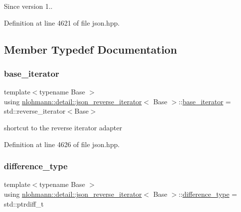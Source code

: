 \begin{DoxySince}{Since}
version 1.. 
\end{DoxySince}


Definition at line 4621 of file json.\+hpp.



\subsection{Member Typedef Documentation}
\mbox{\label{classnlohmann_1_1detail_1_1json__reverse__iterator_a6b2ef1d632fe49bfcc22fbd1abd62395}} 
\subsubsection{\texorpdfstring{base\+\_\+iterator}{base\_iterator}}
{\footnotesize\ttfamily template$<$typename Base $>$ \\
using \hyperlink{classnlohmann_1_1detail_1_1json__reverse__iterator}{nlohmann\+::detail\+::json\+\_\+reverse\+\_\+iterator}$<$ Base $>$\+::\hyperlink{classnlohmann_1_1detail_1_1json__reverse__iterator_a6b2ef1d632fe49bfcc22fbd1abd62395}{base\+\_\+iterator} =  std\+::reverse\+\_\+iterator$<$Base$>$}



shortcut to the reverse iterator adapter 



Definition at line 4626 of file json.\+hpp.

\mbox{\label{classnlohmann_1_1detail_1_1json__reverse__iterator_a9ab55987c05ec6427ad36082e351cc45}} 
\subsubsection{\texorpdfstring{difference\+\_\+type}{difference\_type}}
{\footnotesize\ttfamily template$<$typename Base $>$ \\
using \hyperlink{classnlohmann_1_1detail_1_1json__reverse__iterator}{nlohmann\+::detail\+::json\+\_\+reverse\+\_\+iterator}$<$ Base $>$\+::\hyperlink{classnlohmann_1_1detail_1_1json__reverse__iterator_a9ab55987c05ec6427ad36082e351cc45}{difference\+\_\+type} =  std\+::ptrdiff\+\_\+t}



